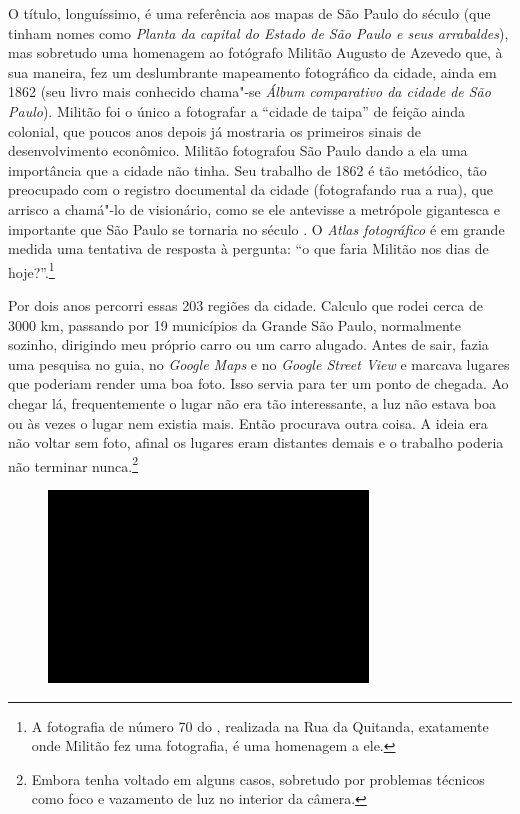 O título, longuíssimo, é uma referência aos mapas de São Paulo do século
 (que tinham nomes como \emph{Planta da capital do Estado de São
Paulo e seus arrabaldes}), mas sobretudo uma homenagem ao fotógrafo
Militão Augusto de Azevedo que, à sua maneira, fez um deslumbrante
mapeamento fotográfico da cidade, ainda em 1862 (seu livro mais
conhecido chama"-se \emph{Álbum comparativo da cidade de São Paulo}).
Militão foi o único a fotografar a ``cidade de taipa'' de feição ainda
colonial, que poucos anos depois já mostraria os primeiros sinais de
desenvolvimento econômico. Militão fotografou São Paulo dando a ela uma
importância que a cidade não tinha. Seu trabalho de 1862 é tão metódico,
tão preocupado com o registro documental da cidade (fotografando rua a
rua), que arrisco a chamá"-lo de visionário, como se ele antevisse a
metrópole gigantesca e importante que São Paulo se tornaria no século
. O \emph{Atlas fotográfico} é em grande medida uma tentativa de
resposta à pergunta: ``o que faria Militão nos dias de hoje?''.\footnote{A
  fotografia de número 70 do {}, realizada na Rua da Quitanda,
  exatamente onde Militão fez uma fotografia, é uma homenagem a ele.}

Por dois anos percorri essas 203 regiões da cidade. Calculo que rodei
cerca de 3000 km, passando por 19 municípios da Grande São Paulo,
normalmente sozinho, dirigindo meu próprio carro ou um carro alugado.
Antes de sair, fazia uma pesquisa no guia, no \emph{Google Maps} e no
\emph{Google Street View} e marcava lugares que poderiam render uma boa
foto. Isso servia para ter um ponto de chegada. Ao chegar lá,
frequentemente o lugar não era tão interessante, a luz não estava boa ou
às vezes o lugar nem existia mais. Então procurava outra coisa. A ideia
era não voltar sem foto, afinal os lugares eram distantes demais e o
trabalho poderia não terminar nunca.\footnote{Embora tenha voltado em
  alguns casos, sobretudo por problemas técnicos como foco e vazamento
  de luz no interior da câmera.}

\begin{figure}[!ht]
\centering
 \includegraphics[width=85mm]{./imgs/im1.jpg}
\caption{\tiny{}}
\end{figure}

